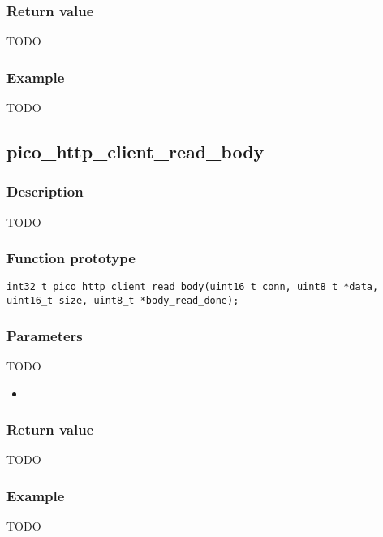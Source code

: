 \subsubsection*{Return value}
TODO
\subsubsection*{Example}
TODO


\subsection{pico\_http\_client\_read\_body}

\subsubsection*{Description}
TODO

\subsubsection*{Function prototype}
\texttt{int32\_t pico\_http\_client\_read\_body(uint16\_t conn, uint8\_t *data, uint16\_t size, uint8\_t *body\_read\_done);}

\subsubsection*{Parameters}
TODO
\begin{itemize}[noitemsep]
\item \texttt{}
\end{itemize}
\subsubsection*{Return value}
TODO
\subsubsection*{Example}
TODO
